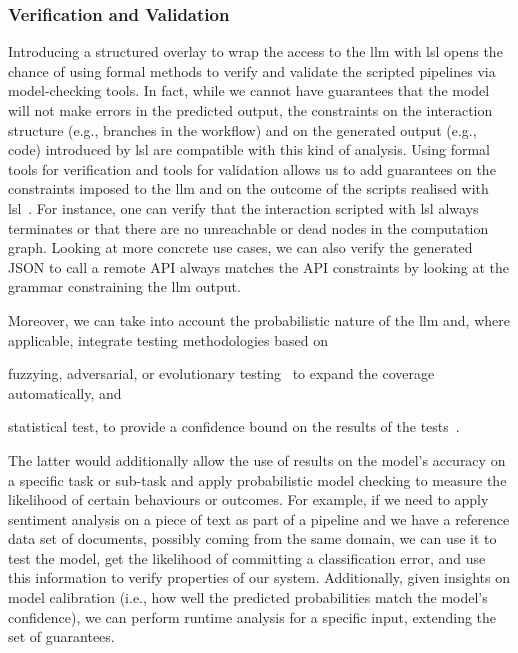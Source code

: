 \documentclass[manuscript,screen]{acmart}
\begin{document}
\subsubsection{Verification and Validation}
\label{sec:verificationandvalidation}


Introducing a structured overlay to wrap the access to the \ac{llm} with \ac{lsl} opens the chance of using formal methods to verify and validate the scripted pipelines via model-checking tools.
In fact, while we cannot have guarantees that the model will not make errors in the predicted output, the constraints on the interaction structure (e.g., branches in the workflow) and on the generated output (e.g., code) introduced by \ac{lsl} are compatible with this kind of analysis.
Using formal tools for verification and tools for validation allows us to add guarantees on the constraints imposed to the \ac{llm} and on the outcome of the scripts realised with \ac{lsl}~\cite{ai2023artificial}.
For instance, one can verify that the interaction scripted with \ac{lsl} always terminates or that there are no unreachable or dead nodes in the computation graph.
Looking at more concrete use cases, we can also verify the generated JSON to call a remote API always matches the API constraints by looking at the grammar constraining the \ac{llm} output.

Moreover, we can take into account the probabilistic nature of the \ac{llm} and, where applicable, integrate testing methodologies based on
\begin{enumerate*}[label=(\arabic*)]
    \item fuzzying, adversarial, or evolutionary testing~\cite{DBLP:journals/corr/abs-2503-00481,DBLP:journals/tse/CorboBDLSC25} to expand the coverage automatically, and
    \item statistical test, to provide a confidence bound on the results of the tests~\cite{DBLP:journals/corr/abs-2503-00481}.
\end{enumerate*}
The latter would additionally allow the use of results on the model's accuracy on a specific task or sub-task and apply probabilistic model checking to measure the likelihood of certain behaviours or outcomes.
For example, if we need to apply sentiment analysis on a piece of text as part of a pipeline and we have a reference data set of documents, possibly coming from the same domain, we can use it to test the model, get the likelihood of committing a classification error, and use this information to verify properties of our system.
Additionally, given insights on model calibration (i.e., how well the predicted probabilities match the model's confidence), we can perform runtime analysis for a specific input, extending the set of guarantees.
\end{document}
